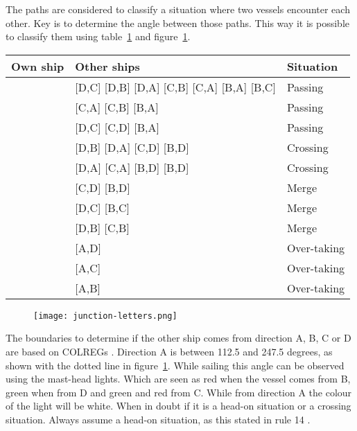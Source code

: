 The paths are considered to classify a situation where two vessels encounter each other. Key is to determine the angle between those paths. This way it is possible to classify them using table~\ref{tab:scenarios-standard} and figure~\ref{fig:junction-letters}.

\begin{table}[p]
	\centering
	\begin{tabular}{l|l|l}
		Own ship & Other ships & Situation\\
		\hline
		\big[A,D\big] & [D,C] [D,B] [D,A] [C,B] [C,A] [B,A] [B,C] & Passing \\
		\big[A,C\big] & [C,A] [C,B] [B,A] & Passing \\
		\big[A,B\big] & [D,C] [C,D] [B,A] & Passing \\
		\big[A,C\big] & [D,B] [D,A] [C,D] [B,D] & Crossing \\
		\big[A,B\big] & [D,A] [C,A] [B,D] [B,D] & Crossing \\
		\big[A,D\big] & [C,D] [B,D] & Merge \\
		\big[A,C\big] & [D,C] [B,C] & Merge \\
		\big[A,B\big] & [D,B] [C,B] & Merge \\
		\big[A,D\big] & [A,D] & Over-taking \\
		\big[A,C\big] & [A,C] & Over-taking \\
		\big[A,B\big] & [A,B] & Over-taking \\
	\end{tabular}
	\label{tab:scenarios-standard}
\end{table}

\begin{figure}[p]
	\centering
	\texttt{[image: junction-letters.png]}
	\label{fig:junction-letters}
\end{figure}

The boundaries to determine if the other ship comes from direction A, B, C or D are based on \ac{COLREGs} \cite{IMO1972}. Direction A is between 112.5 and 247.5 degrees, as shown with the dotted line in figure~\ref{fig:junction-letters}. While sailing this angle can be observed using the mast-head lights. Which are seen as red when the vessel comes from B, green when from D and green and red from C. While from direction A the colour of the light will be white. When in doubt if it is a head-on situation or a crossing situation. Always assume a head-on situation, as this stated in rule 14 \cite{IMO1972}.


